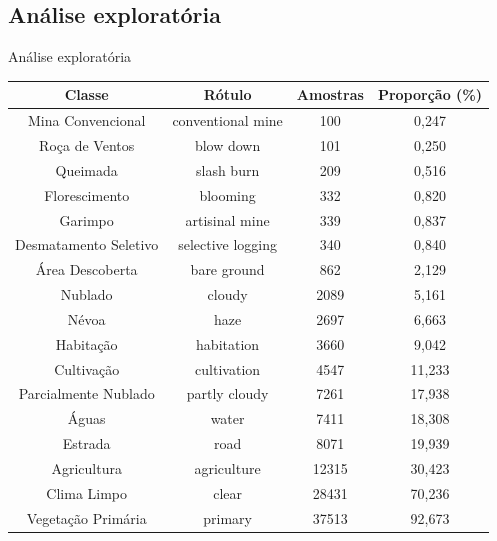\documentclass[8pt]{beamer}
\begin{document}
\subsection{Análise exploratória}
\begin{frame}{Análise exploratória}
    \begin{tabular}{*{4}{c}}
        \hline
        Classe                  &            Rótulo &  Amostras      &  Proporção (\%) \\
        \hline
        Mina Convencional       & conventional mine &        100     &       0,247 \\
        Roça de Ventos          &         blow down &        101     &       0,250 \\
        Queimada                &        slash burn &        209     &       0,516 \\
        Florescimento           &          blooming &        332     &       0,820 \\
        Garimpo                 &    artisinal mine &        339     &       0,837 \\
        Desmatamento Seletivo   & selective logging &        340     &       0,840 \\
        Área Descoberta         &       bare ground &        862     &       2,129 \\
        Nublado                 &            cloudy &       2089     &       5,161 \\
        Névoa                   &              haze &       2697     &       6,663 \\
        Habitação               &        habitation &       3660     &       9,042 \\
        Cultivação              &       cultivation &       4547     &      11,233 \\
        Parcialmente Nublado    &     partly cloudy &       7261     &      17,938 \\
        Águas                   &             water &       7411     &      18,308 \\
        Estrada                 &              road &       8071     &      19,939 \\
        Agricultura             &       agriculture &      12315     &      30,423 \\
        Clima Limpo             &             clear &      28431     &      70,236 \\
        Vegetação Primária      &           primary &      37513     &      92,673 \\
        \hline
    \end{tabular}
  
\end{frame}
\end{document}
